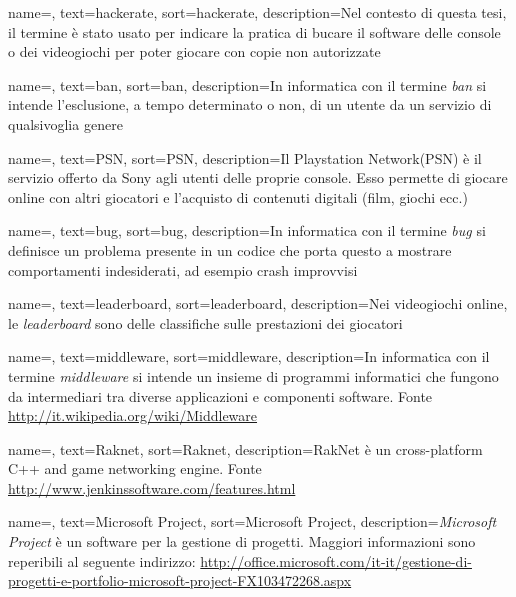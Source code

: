 {
	name=,
	text=hackerate,
	sort=hackerate,
	description={Nel contesto di questa tesi, il termine è stato usato per indicare la pratica di bucare il software delle console o dei videogiochi per poter giocare con copie non autorizzate}
}

{
	name=,
	text=ban,
	sort=ban,
	description={In informatica con il termine \emph{ban} si intende l'esclusione, a tempo determinato o non, di un utente da un servizio di qualsivoglia genere}
}

{
	name=,
	text=PSN\textregistered,
	sort=PSN,
	description={Il Playstation Network\textregistered (PSN\textregistered) è il servizio offerto da Sony agli utenti delle proprie console. Esso permette di giocare online con altri giocatori e l'acquisto di contenuti digitali (film, giochi ecc.)}
}

{
	name=,
	text=bug,
	sort=bug,
	description={In informatica con il termine \emph{bug} si definisce un problema presente in un codice che porta questo a mostrare comportamenti indesiderati, ad esempio crash improvvisi}
}

{
	name=,
	text=leaderboard,
	sort=leaderboard,
	description={Nei videogiochi online, le \emph{leaderboard} sono delle classifiche sulle prestazioni dei giocatori}
}

{
	name=,
	text=middleware,
	sort=middleware,
	description={In informatica con il termine \emph{middleware} si intende un insieme di programmi informatici che fungono da intermediari tra diverse applicazioni e componenti software. Fonte \url{http://it.wikipedia.org/wiki/Middleware}}
}

{
	name=,
	text=Raknet,
	sort=Raknet,
	description={RakNet è un cross-platform C++ and \Csharp\space game networking engine. Fonte \url{http://www.jenkinssoftware.com/features.html}}
}

{
	name=,
	text=Microsoft Project,
	sort=Microsoft Project,
	description={\emph{Microsoft Project} è un software per la gestione di progetti. Maggiori informazioni sono reperibili al seguente indirizzo: \url{http://office.microsoft.com/it-it/gestione-di-progetti-e-portfolio-microsoft-project-FX103472268.aspx}}
}

